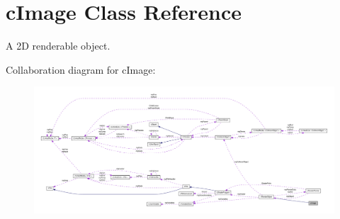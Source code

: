 \hypertarget{classc_image}{
\section{cImage Class Reference}
\label{classc_image}
}


A 2D renderable object.  




Collaboration diagram for cImage:\nopagebreak
\begin{figure}[H]
\begin{center}
\leavevmode
\includegraphics[width=400pt]{classc_image__coll__graph}
\end{center}
\end{figure}
